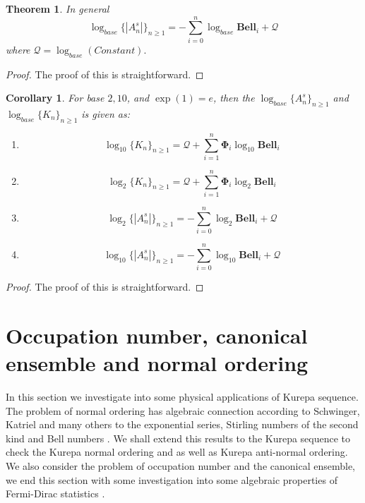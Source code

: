 \documentclass[pdflatex,sn-mathphys-num]{sn-jnl}%
\newtheorem{theorem}{Theorem}
\newtheorem{corollary}{Corollary}
\theoremstyle{thmstyleone}%
\theoremstyle{thmstyletwo}%
\theoremstyle{thmstylethree}%
\begin{document}
\begin{theorem}
    In general $$\log_{base}\lbrace |A_n^s|\rbrace_{n\geq 1}=-\sum_{i=0}^{n}\log_{base}\mathbf{Bell}_i +\mathcal{Q}$$
where $\mathcal{Q}=\log_{base}(Constant).$
\end{theorem}
\begin{proof}
    The proof of this is straightforward.
\end{proof}

\begin{corollary}
For base $2, 10$, and $\exp{(1)}=e$, then the $\log_{base}\lbrace A_n^s\rbrace_{n\geq 1}$ and $\log_{base}\lbrace K_n\rbrace_{n\geq 1}$ is given as:
\begin{enumerate}

\item $$ \log_{10} \lbrace K_n\rbrace_{n\geq 1}=\mathcal{Q}+\sum_{i=1}^{n}\mathbf{\Phi}_i \log_{10}\mathbf{Bell}_i$$

\item $$ \log_{2} \lbrace K_n\rbrace_{n\geq 1}=\mathcal{Q}+\sum_{i=1}^{n}\mathbf{\Phi}_i \log_{2}\mathbf{Bell}_i$$

    \item $$\log_{2}\lbrace| A_n^s|\rbrace_{n\geq 1}=-\sum_{i=0}^{n}\log_{2}\mathbf{Bell}_i +\mathcal{Q}$$
    \item $$\log_{10}\lbrace |A_n^s|\rbrace_{n\geq 1}=-\sum_{i=0}^{n}\log_{10}\mathbf{Bell}_i +\mathcal{Q}$$
    
\end{enumerate}
\end{corollary}
\begin{proof}
    The proof of this is straightforward.
\end{proof}





\section{Occupation number, canonical ensemble and normal ordering}\label{Physics}
In this section we investigate into some physical applications of Kurepa sequence. The problem of normal ordering has algebraic connection according to Schwinger, Katriel and many others to the exponential series, Stirling numbers of the second kind and Bell numbers \cite{osti_4389568, katriel1974combinatorial, katriel2000bell, mehta2009sudarshan, PhysRevLett.18.752, osti_4310789, blasiak2005combinatorics, blasiak2007combinatorics, mansour2016commutation}. We shall extend this results to the Kurepa sequence to check the Kurepa normal ordering and as well as Kurepa anti-normal ordering. We also consider the problem of occupation number and the canonical ensemble, we end this section with some investigation into some algebraic properties of Fermi-Dirac statistics \cite{planck1900theory, greiner2012thermodynamics, srivatsan2006gentile, dai2004gentile, gentile1940itosservazioni}.
\end{document}
